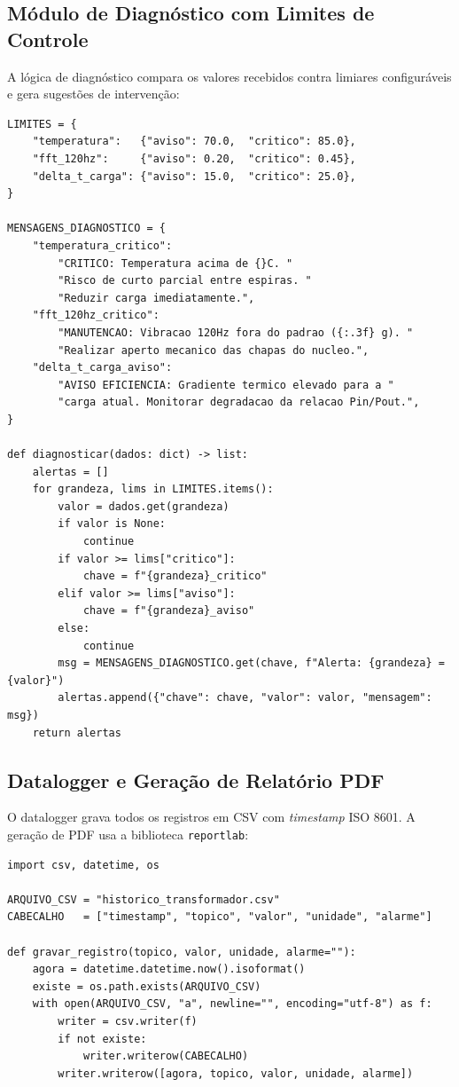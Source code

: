 \documentclass[12pt, a4paper]{article}
\begin{document}
\subsection{Módulo de Diagnóstico com Limites de Controle}

A lógica de diagnóstico compara os valores recebidos contra limiares configuráveis e gera sugestões de intervenção:

\begin{lstlisting}[style=python, caption={Lógica de diagnóstico com limites de controle}]
LIMITES = {
    "temperatura":   {"aviso": 70.0,  "critico": 85.0},
    "fft_120hz":     {"aviso": 0.20,  "critico": 0.45},
    "delta_t_carga": {"aviso": 15.0,  "critico": 25.0},
}

MENSAGENS_DIAGNOSTICO = {
    "temperatura_critico":
        "CRITICO: Temperatura acima de {}C. "
        "Risco de curto parcial entre espiras. "
        "Reduzir carga imediatamente.",
    "fft_120hz_critico":
        "MANUTENCAO: Vibracao 120Hz fora do padrao ({:.3f} g). "
        "Realizar aperto mecanico das chapas do nucleo.",
    "delta_t_carga_aviso":
        "AVISO EFICIENCIA: Gradiente termico elevado para a "
        "carga atual. Monitorar degradacao da relacao Pin/Pout.",
}

def diagnosticar(dados: dict) -> list:
    alertas = []
    for grandeza, lims in LIMITES.items():
        valor = dados.get(grandeza)
        if valor is None:
            continue
        if valor >= lims["critico"]:
            chave = f"{grandeza}_critico"
        elif valor >= lims["aviso"]:
            chave = f"{grandeza}_aviso"
        else:
            continue
        msg = MENSAGENS_DIAGNOSTICO.get(chave, f"Alerta: {grandeza} = {valor}")
        alertas.append({"chave": chave, "valor": valor, "mensagem": msg})
    return alertas
\end{lstlisting}

\subsection{Datalogger e Geração de Relatório PDF}

O datalogger grava todos os registros em CSV com \textit{timestamp} ISO 8601. A geração de PDF usa a biblioteca \texttt{reportlab}:

\begin{lstlisting}[style=python, caption={Datalogger CSV com timestamp}]
import csv, datetime, os

ARQUIVO_CSV = "historico_transformador.csv"
CABECALHO   = ["timestamp", "topico", "valor", "unidade", "alarme"]

def gravar_registro(topico, valor, unidade, alarme=""):
    agora = datetime.datetime.now().isoformat()
    existe = os.path.exists(ARQUIVO_CSV)
    with open(ARQUIVO_CSV, "a", newline="", encoding="utf-8") as f:
        writer = csv.writer(f)
        if not existe:
            writer.writerow(CABECALHO)
        writer.writerow([agora, topico, valor, unidade, alarme])
\end{lstlisting}
\end{document}
